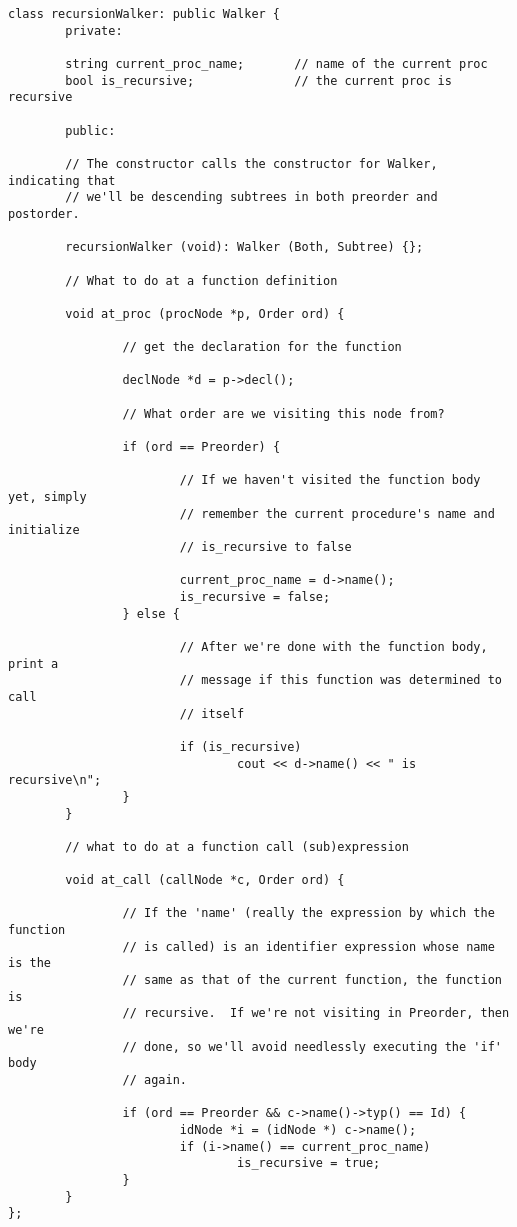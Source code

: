 \documentclass[10pt]{article}
\begin{document}
\begin{small}
\begin{verbatim}
class recursionWalker: public Walker {
        private:

        string current_proc_name;       // name of the current proc
        bool is_recursive;              // the current proc is recursive

        public:

        // The constructor calls the constructor for Walker, indicating that
        // we'll be descending subtrees in both preorder and postorder.

        recursionWalker (void): Walker (Both, Subtree) {};

        // What to do at a function definition

        void at_proc (procNode *p, Order ord) {

                // get the declaration for the function

                declNode *d = p->decl();

                // What order are we visiting this node from?

                if (ord == Preorder) {

                        // If we haven't visited the function body yet, simply 
                        // remember the current procedure's name and initialize 
                        // is_recursive to false

                        current_proc_name = d->name();
                        is_recursive = false;
                } else {

                        // After we're done with the function body, print a 
                        // message if this function was determined to call 
                        // itself

                        if (is_recursive)
                                cout << d->name() << " is recursive\n";
                }
        }

        // what to do at a function call (sub)expression

        void at_call (callNode *c, Order ord) {

                // If the 'name' (really the expression by which the function 
                // is called) is an identifier expression whose name is the 
                // same as that of the current function, the function is 
                // recursive.  If we're not visiting in Preorder, then we're
                // done, so we'll avoid needlessly executing the 'if' body 
                // again.

                if (ord == Preorder && c->name()->typ() == Id) {
                        idNode *i = (idNode *) c->name();
                        if (i->name() == current_proc_name)
                                is_recursive = true;
                }
        }
};
\end{verbatim}
\end{small}
\end{document}
